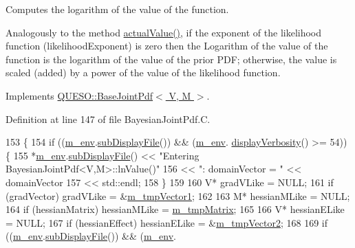 Computes the logarithm of the value of the function. 

Analogously to the method \hyperlink{class_q_u_e_s_o_1_1_bayesian_joint_pdf_ad67362b4ab48a722db976430cf03165e}{actual\-Value()}, if the exponent of the likelihood function (likelihood\-Exponent) is zero then the Logarithm of the value of the function is the logarithm of the value of the prior P\-D\-F; otherwise, the value is scaled (added) by a power of the value of the likelihood function. 

Implements \hyperlink{class_q_u_e_s_o_1_1_base_joint_pdf_aaeb1d91fd791399a502f451b07bb1bfe}{Q\-U\-E\-S\-O\-::\-Base\-Joint\-Pdf$<$ V, M $>$}.



Definition at line 147 of file Bayesian\-Joint\-Pdf.\-C.


\begin{DoxyCode}
153 \{
154   \textcolor{keywordflow}{if} ((\hyperlink{class_q_u_e_s_o_1_1_base_scalar_function_adf44141aeb765d97613286f88f235f04}{m\_env}.\hyperlink{class_q_u_e_s_o_1_1_base_environment_a8a0064746ae8dddfece4229b9ad374d6}{subDisplayFile}()) && (\hyperlink{class_q_u_e_s_o_1_1_base_scalar_function_adf44141aeb765d97613286f88f235f04}{m\_env}.
      \hyperlink{class_q_u_e_s_o_1_1_base_environment_a1fe5f244fc0316a0ab3e37463f108b96}{displayVerbosity}() >= 54)) \{
155     *\hyperlink{class_q_u_e_s_o_1_1_base_scalar_function_adf44141aeb765d97613286f88f235f04}{m\_env}.\hyperlink{class_q_u_e_s_o_1_1_base_environment_a8a0064746ae8dddfece4229b9ad374d6}{subDisplayFile}() << \textcolor{stringliteral}{"Entering BayesianJointPdf<V,M>::lnValue()"}
156                             << \textcolor{stringliteral}{": domainVector = "} << domainVector
157                             << std::endl;
158   \}
159 
160   V* gradVLike = NULL;
161   \textcolor{keywordflow}{if} (gradVector) gradVLike = &\hyperlink{class_q_u_e_s_o_1_1_bayesian_joint_pdf_af4252d2628298423a60335eef72136c6}{m\_tmpVector1};
162 
163   M* hessianMLike = NULL;
164   \textcolor{keywordflow}{if} (hessianMatrix) hessianMLike = \hyperlink{class_q_u_e_s_o_1_1_bayesian_joint_pdf_a686da1b57929c8b506a5e8fe8974603d}{m\_tmpMatrix};
165 
166   V* hessianELike = NULL;
167   \textcolor{keywordflow}{if} (hessianEffect) hessianELike = &\hyperlink{class_q_u_e_s_o_1_1_bayesian_joint_pdf_a2c81721bddf0ffd5547751f1a8221a5d}{m\_tmpVector2};
168 
169   \textcolor{keywordflow}{if} ((\hyperlink{class_q_u_e_s_o_1_1_base_scalar_function_adf44141aeb765d97613286f88f235f04}{m\_env}.\hyperlink{class_q_u_e_s_o_1_1_base_environment_a8a0064746ae8dddfece4229b9ad374d6}{subDisplayFile}()) && (\hyperlink{class_q_u_e_s_o_1_1_base_scalar_function_adf44141aeb765d97613286f88f235f04}{m\_env}.

\end{DoxyCode}

